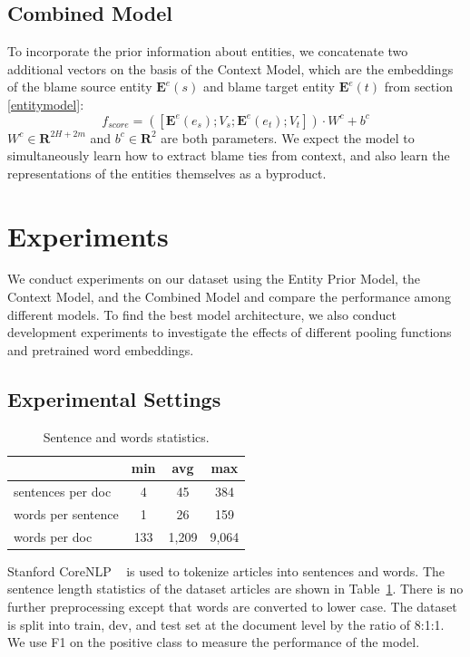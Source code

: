 \documentclass[letterpaper]{article} %
\begin{document}
\subsection{Combined Model}

To incorporate the prior information about entities, we concatenate two additional vectors on the basis of the Context Model, which are the embeddings of the blame source entity $\mathbf{E}^e(s)$ and blame target entity $\mathbf{E}^e(t)$ from section \ref{entitymodel}: $$f_{score} = ([\mathbf{E}^e(e_s); V_s; \mathbf{E}^e(e_t); V_t]) \cdot W^c + b^c $$ $W^c \in \mathbf{R}^{2H + 2m}$ and $b^c \in \mathbf{R}^{2}$ are both parameters. We expect the model to simultaneously learn how to extract blame ties from context, and also learn the representations of the entities themselves as a byproduct.

\section{Experiments}
\label{experiment}

We conduct experiments on our dataset using the Entity Prior Model, the Context Model, and the Combined Model and compare the performance among different models. To find the best model architecture, we also conduct development experiments to investigate the effects of different pooling functions and pretrained word embeddings.

\subsection{Experimental Settings}

\begin{table}[t!]
\centering
\begin{tabular}{l c c c} 
 \hline
 &{\bf min} & {\bf avg}  &{\bf max} \\ 
 \hline\hline
sentences per doc & 4 & 45 & 384 \\ 
words per sentence & 1 & 26 & 159 \\
words per doc & 133 & 1,209 & 9,064 \\
 \hline
\end{tabular}
\caption{Sentence and words statistics.}
\label{table:lengthstatistic}
\end{table}

Stanford CoreNLP ~\cite{manning-EtAl:2014:P14-5} is used to tokenize articles into sentences and words. The sentence length statistics of the dataset articles are shown in Table~\ref{table:lengthstatistic}. There is no further preprocessing except that words are converted to lower case. The dataset is split into train, dev, and test set at the document level by the ratio of 8:1:1. We use F1 on the positive class to measure the performance of the model.
\end{document}
